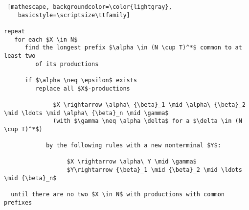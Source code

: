 \documentclass[
    border=0.2cm,
    convert={density=600}
]{standalone}
\begin{document}
\begin{lstlisting} [mathescape, backgroundcolor=\color{lightgray},
	basicstyle=\scriptsize\ttfamily]
	
repeat
   for each $X \in N$ 
      find the longest prefix $\alpha \in (N \cup T)^*$ common to at least two 
         of its productions

      if $\alpha \neq \epsilon$ exists
         replace all $X$-productions

              $X \rightarrow \alpha\ {\beta}_1 \mid \alpha\ {\beta}_2 \mid \ldots \mid \alpha\ {\beta}_n \mid \gamma$ 
              (with $\gamma \neq \alpha \delta$ for a $\delta \in (N \cup T)^*$)
             
	        by the following rules with a new nonterminal $Y$:

                  $X \rightarrow \alpha\ Y \mid \gamma$
                  $Y\rightarrow {\beta}_1 \mid {\beta}_2 \mid \ldots \mid {\beta}_n$

  until there are no two $X \in N$ with productions with common prefixes
\end{lstlisting}
\end{document}
